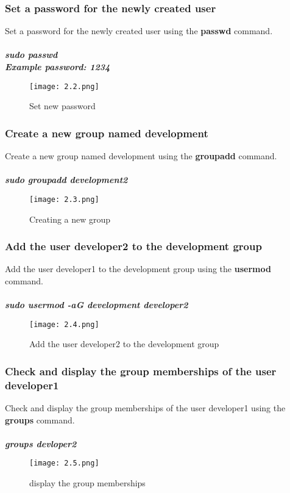 \documentclass[12pt]{article}
\begin{document}
\subsubsection{Set a password for the newly created user}
Set a password for the newly created user using the \textbf{passwd} command.
\\ \\ \textbf{\textit {sudo passwd}}
\\ \textbf{\textit {Example password: 1234}}

\begin{figure}[H] %
    \centering
    \texttt{[image: 2.2.png]}
    \caption{Set new password}
    \label{fig:kaniz3}
\end{figure}

\subsubsection{Create a new group named development}
Create a new group named development using the \textbf{groupadd} command.
\\ \\ \textbf{\textit {sudo groupadd development2}}

\begin{figure}[H] %
    \centering
    \texttt{[image: 2.3.png]}
    \caption{Creating a new group}
    \label{fig:kaniz4}
\end{figure}

\subsubsection{Add the user developer2 to the development group}
Add the user developer1 to the development group using the \textbf{usermod} command.
\\ \\ \textbf{\textit {sudo usermod -aG development developer2}}

\begin{figure}[H] %
    \centering
    \texttt{[image: 2.4.png]}
    \caption{Add the user developer2 to the development group}
    \label{fig:kaniz5}
\end{figure}


\subsubsection{Check and display the group memberships of the user developer1}
Check and display the group memberships of the user developer1 using the
\textbf{groups} command.
\\ \\ \textbf{\textit {groups devloper2}}
\begin{figure}[H] %
    \centering
    \texttt{[image: 2.5.png]}
    \caption{display the group memberships}
    \label{fig:kaniz6}
\end{figure}
\end{document}
